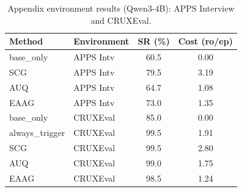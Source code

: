 \begin{table}[t]
\centering
\caption{Appendix environment results (Qwen3-4B): APPS Interview and CRUXEval.}
\label{tab:appendix-results}
\begin{tabular}{llcc}
\toprule
\textbf{Method} & \textbf{Environment} & \textbf{SR (\%)} & \textbf{Cost (ro/ep)} \\
\midrule
base\_only        & APPS Intv  & 60.5 & 0.00 \\
SCG               & APPS Intv  & 79.5 & 3.19 \\
AUQ               & APPS Intv  & 64.7 & 1.08 \\
EAAG              & APPS Intv  & 73.0 & 1.35 \\
\midrule
base\_only        & CRUXEval   & 85.0 & 0.00 \\
always\_trigger   & CRUXEval   & 99.5 & 1.91 \\
SCG               & CRUXEval   & 99.5 & 2.80 \\
AUQ               & CRUXEval   & 99.0 & 1.75 \\
EAAG              & CRUXEval   & 98.5 & 1.24 \\
\bottomrule
\end{tabular}
\end{table}
